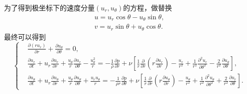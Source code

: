 \documentclass[12pt]{article}
\begin{document}
为了得到极坐标下的速度分量$\left(u_{r}, u_{\theta}\right)$的方程，做替换
\begin{gather}
	u=u_{r} \cos \theta-u_{\theta} \sin \theta, \\
	v=u_{r} \sin \theta+u_{\theta} \cos \theta .
\end{gather}
最终可以得到
\begin{equation}
	\left\{\begin{aligned}
		 & \frac{\partial\left(r u_{r}\right)}{\partial r}+\frac{\partial u_{\theta}}{\partial \theta}=0, \\ &\frac{\partial u_{r}}{\partial t}+u_{r} \frac{\partial u_{r}}{\partial r}+\frac{u_{\theta}}{r} \frac{\partial u_{r}}{\partial \theta}-\frac{u_{\theta}^{2}}{r}=-\frac{1}{\rho} \frac{\partial p}{\partial r}+\nu\left[\frac{1}{r} \frac{\partial}{\partial r}\left(r \frac{\partial u_{r}}{\partial r}\right)-\frac{u_{r}}{r^{2}}+\frac{1}{r^{2}} \frac{\partial^{2} u_{r}}{\partial \theta^{2}}-\frac{2}{r^{2}} \frac{\partial u_{\theta}}{\partial \theta}\right],
		\\ &\frac{\partial u_{\theta}}{\partial t}+u_{r} \frac{\partial u_{\theta}}{\partial r}+\frac{u_{\theta}}{r} \frac{\partial u_{\theta}}{\partial \theta}+\frac{u_{r} u_{\theta}}{r}=-\frac{1}{\rho r} \frac{\partial p}{\partial \theta}+\nu\left[\frac{1}{r} \frac{\partial}{\partial r}\left(r \frac{\partial u_{\theta}}{\partial r}\right)-\frac{u_{\theta}}{r^{2}}+\frac{1}{r^{2}} \frac{\partial^{2} u_{\theta}}{\partial \theta^{2}}+\frac{2}{r^{2}} \frac{\partial u_{r}}{\partial \theta}\right].\end{aligned}\right.
\end{equation}
\end{document}
